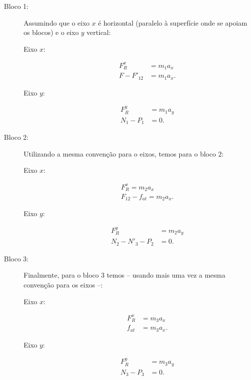\begin{description}
    \item[Bloco 1:] Assumindo que o eixo $x$ é horizontal (paralelo à superfície onde se apoiam os blocos) e o eixo $y$ vertical:
        \begin{description}
            \item[Eixo $x$:]
                \begin{align}
                    F_R^x &= m_1 a_x \\
                    F - F'_{12} &= m_1 a_x.
                \end{align}
            \item[Eixo $y$:]
                \begin{align}
                    F_R^y &= m_1 a_y \\
                    N_1 - P_1 &= 0.
                \end{align}
        \end{description}
    \item[Bloco 2:] Utilizando a mesma convenção para o eixos, temos para o bloco 2:
        \begin{description}
            \item[Eixo $x$:]
                \begin{align}
                    F_R^x = m_2 a_x \\
                    F_{12} - f_{at} = m_2 a_x.
                \end{align}
            \item[Eixo $y$:]
                \begin{align}
                    F_R^y &= m_2 a_y \\
                    N_2 - N'_3 - P_2 &= 0.
                \end{align}
        \end{description}
    \item[Bloco 3:] Finalmente, para o bloco 3 temos -- usando mais uma vez a mesma convenção para os eixos --:
        \begin{description}
            \item[Eixo $x$:]
                \begin{align}
                    F_R^x &= m_3 a_x \\
                    f_{at} &= m_3 a_x. \label{Eq:DiscForcasInternasBl2X}
                \end{align}
            \item[Eixo $y$:]
                \begin{align}
                    F_R^y &= m_3 a_y \\
                    N_3 - P_3 &= 0.
                \end{align}
        \end{description}
\end{description}

